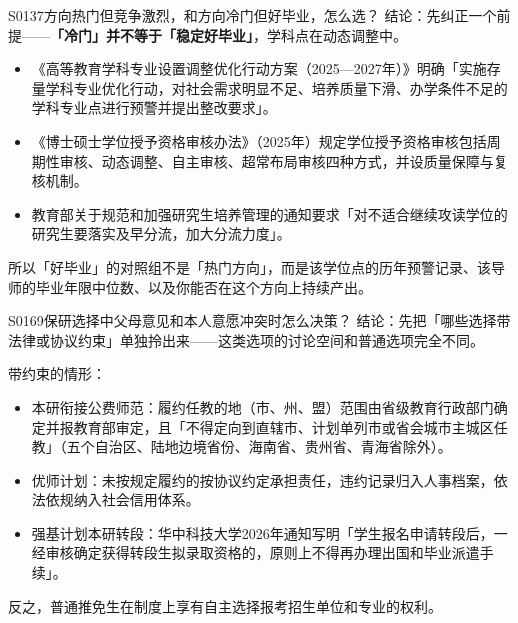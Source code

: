 \begin{qa}{S0137}{方向热门但竞争激烈，和方向冷门但好毕业，怎么选？}
结论：先纠正一个前提——\textbf{「冷门」并不等于「稳定好毕业」}，学科点在动态调整中。

\begin{itemize}
  \item 《高等教育学科专业设置调整优化行动方案（2025—2027年）》明确「实施存量学科专业优化行动，对社会需求明显不足、培养质量下滑、办学条件不足的学科专业点进行预警并提出整改要求」。
  \item 《博士硕士学位授予资格审核办法》（2025年）规定学位授予资格审核包括周期性审核、动态调整、自主审核、超常布局审核四种方式，并设质量保障与复核机制。
  \item 教育部关于规范和加强研究生培养管理的通知要求「对不适合继续攻读学位的研究生要落实及早分流，加大分流力度」。
\end{itemize}

所以「好毕业」的对照组不是「热门方向」，而是该学位点的历年预警记录、该导师的毕业年限中位数、以及你能否在这个方向上持续产出。
\end{qa}

\begin{qa}{S0169}{保研选择中父母意见和本人意愿冲突时怎么决策？}
结论：先把「哪些选择带法律或协议约束」单独拎出来——这类选项的讨论空间和普通选项完全不同。

带约束的情形：
\begin{itemize}
  \item 本研衔接公费师范：履约任教的地（市、州、盟）范围由省级教育行政部门确定并报教育部审定，且「不得定向到直辖市、计划单列市或省会城市主城区任教」（五个自治区、陆地边境省份、海南省、贵州省、青海省除外）。
  \item 优师计划：未按规定履约的按协议约定承担责任，违约记录归入人事档案，依法依规纳入社会信用体系。
  \item 强基计划本研转段：华中科技大学2026年通知写明「学生报名申请转段后，一经审核确定获得转段生拟录取资格的，原则上不得再办理出国和毕业派遣手续」。
\end{itemize}

反之，普通推免生在制度上享有自主选择报考招生单位和专业的权利。
\end{qa}

